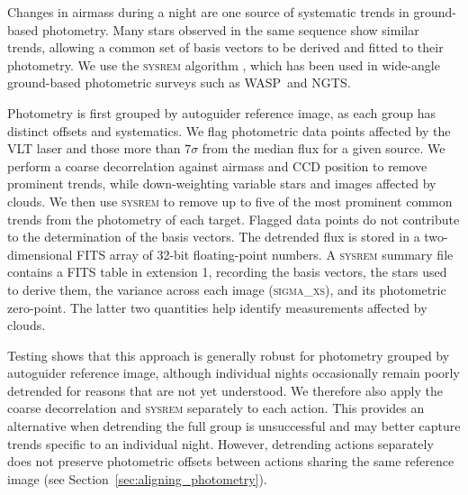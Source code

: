 \documentclass[fleqn,usenatbib]{mnras}
\newcommand{\ngts}{{NGTS}}
\newcommand{\wasp}{{WASP}}
\begin{document}
Changes in airmass during a night are one source of systematic trends in ground-based photometry. Many stars observed in the same sequence show similar trends, allowing a common set of basis vectors to be derived and fitted to their photometry. We use the \textsc{sysrem} algorithm \citep{2005MNRAS.356.1466T}, which has been used in wide-angle ground-based photometric surveys such as \wasp\ and \ngts.

Photometry is first grouped by autoguider reference image, as each group has distinct offsets and systematics. We flag photometric data points affected by the VLT laser and those more than $7\sigma$ from the median flux for a given source. We perform a coarse decorrelation against airmass and CCD position to remove prominent trends, while down-weighting variable stars and images affected by clouds. We then use \textsc{sysrem} to remove up to five of the most prominent common trends from the photometry of each target. Flagged data points do not contribute to the determination of the basis vectors. The detrended flux is stored in a two-dimensional FITS array of 32-bit floating-point numbers. A \textsc{sysrem} summary file contains a FITS table in extension 1, recording the basis vectors, the stars used to derive them, the variance across each image (\textsc{sigma\_xs}), and its photometric zero-point. The latter two quantities help identify measurements affected by clouds.


Testing shows that this approach is generally robust for photometry grouped by autoguider reference image, although individual nights occasionally remain poorly detrended for reasons that are not yet understood. We therefore also apply the coarse decorrelation and \textsc{sysrem} separately to each action. This provides an alternative when detrending the full group is unsuccessful and may better capture trends specific to an individual night. However, detrending actions separately does not preserve photometric offsets between actions sharing the same reference image (see Section~\ref{sec:aligning_photometry}).




\end{document}
